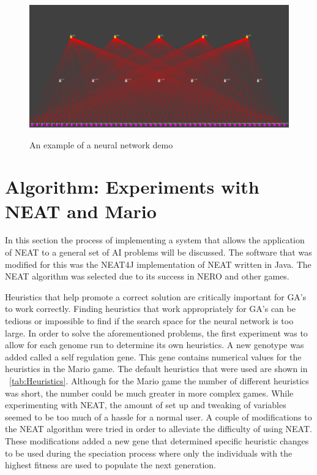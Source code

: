 \documentclass[12pt]{ucthesis} \newif\ifpdf \ifx\pdfoutput\undefined
\begin{document}
\begin{figure}[h!]
  \caption{An example of a neural network demo}
  \centering
    \includegraphics[width=1\textwidth]{simplemarionet.png}
   \label{fig:simplemarionet} 
\end{figure}


\chapter{Algorithm: Experiments with NEAT and Mario}


In this section the process of implementing a system that allows the
application of NEAT to a general set of AI problems will be discussed. The
software that was modified for this was the NEAT4J implementation of NEAT
written in Java. The NEAT algorithm was selected due to its success in NERO and
other games\cite{stanley:phd04}.

Heuristics that help promote a correct solution are critically important for
GA’s to work correctly. Finding heuristics that work appropriately for GA’s can be
tedious or impossible to find if the search space for the neural network is too
large.
In order to solve the aforementioned problems, the first experiment was to allow
for each genome run to determine its own heuristics. A new genotype was added
called a self regulation gene. This gene contains numerical values for the
heuristics in the Mario game. The default heuristics that were used are shown in
~\ref{tab:Heuristics}. Although for the Mario game the number of different
heuristics was short, the number could be much greater in more complex games.
While experimenting with NEAT, the amount of set up and tweaking of variables seemed to be too much of a hassle
for a normal user. A couple of modifications to the NEAT algorithm were tried
in order to alleviate the difficulty of using NEAT. These modifications added a
new gene that determined specific heuristic changes to be used during the speciation process where only the individuals with the highest fitness are used to populate
the next generation.
\end{document}

